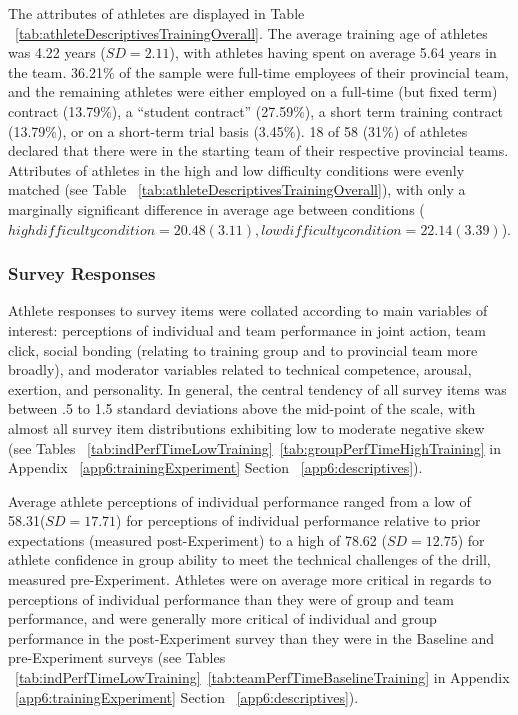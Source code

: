 The attributes of athletes are displayed in Table ~\ref{tab:athleteDescriptivesTrainingOverall}. The average training age of athletes was 4.22 years ($SD = 2.11$), with athletes having spent on average 5.64 years in the team. 36.21\% of the sample were full-time employees of their provincial team, and the remaining athletes were either employed on a full-time (but fixed term) contract
(13.79\%), a ``student contract'' (27.59\%), a short term training contract (13.79\%), or on a short-term trial basis (3.45\%).  18 of 58 (31\%) of athletes declared that there were in the starting team of their respective provincial teams.
Attributes of athletes in the high and low difficulty conditions were evenly matched (see Table ~\ref{tab:athleteDescriptivesTrainingOverall}), with only a marginally significant difference in average age between conditions ($high difficulty condition = 20.48(3.11), low difficulty condition = 22.14 (3.39)$).

\subsubsection{Survey Responses\label{sec:surveyResponses}}
Athlete responses to survey items were collated according to main variables of interest: perceptions of individual and team performance in joint action, team click, social bonding (relating to training group and to provincial team more broadly), and moderator variables related to technical competence, arousal, exertion, and personality. In general, the central tendency of all survey items was between .5 to 1.5 standard deviations above the mid-point of the scale, with almost all survey item distributions exhibiting low to moderate negative skew (see Tables ~\ref{tab:indPerfTimeLowTraining}\nobreakdash~\ref{tab:groupPerfTimeHighTraining} in Appendix ~\ref{app6:trainingExperiment} Section ~\ref{app6:descriptives}).

Average athlete perceptions of individual performance ranged from a low of 58.31($SD = 17.71$) for perceptions of individual performance relative to prior expectations (measured post-Experiment) to a high of 78.62 ($SD = 12.75$) for athlete confidence in group ability to meet the technical challenges of the drill, measured pre-Experiment.  Athletes were on average more critical in regards to perceptions of individual performance than they were of group and team performance, and were generally more critical of individual and group performance in the post-Experiment survey than they were in the Baseline and pre-Experiment surveys (see Tables ~\ref{tab:indPerfTimeLowTraining}\nobreakdash~\ref{tab:teamPerfTimeBaselineTraining} in Appendix ~\ref{app6:trainingExperiment} Section ~\ref{app6:descriptives}).

